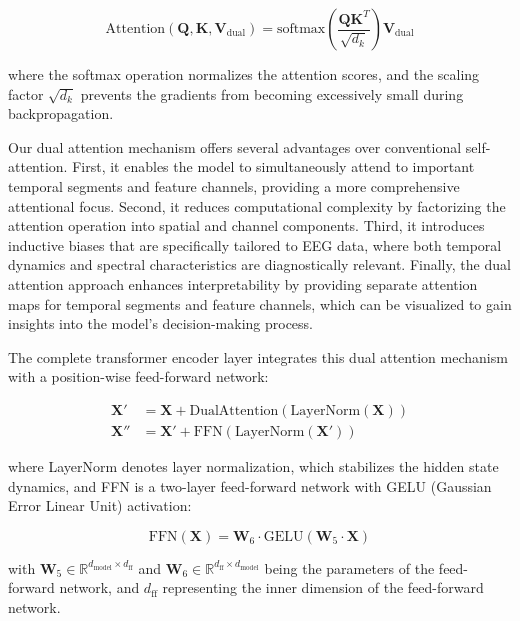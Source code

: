 \documentclass[pdflatex,sn-mathphys-num]{sn-jnl}%
\theoremstyle{thmstyleone}%
\theoremstyle{thmstyletwo}%
\theoremstyle{thmstylethree}%
\begin{document}
\begin{equation}
\text{Attention}(\mathbf{Q}, \mathbf{K}, \mathbf{V}_{\text{dual}}) = \text{softmax}\left(\frac{\mathbf{Q}\mathbf{K}^T}{\sqrt{d_k}}\right)\mathbf{V}_{\text{dual}}
\end{equation}

where the softmax operation normalizes the attention scores, and the scaling factor $\sqrt{d_k}$ prevents the gradients from becoming excessively small during backpropagation.

Our dual attention mechanism offers several advantages over conventional self-attention. First, it enables the model to simultaneously attend to important temporal segments and feature channels, providing a more comprehensive attentional focus. Second, it reduces computational complexity by factorizing the attention operation into spatial and channel components. Third, it introduces inductive biases that are specifically tailored to EEG data, where both temporal dynamics and spectral characteristics are diagnostically relevant. Finally, the dual attention approach enhances interpretability by providing separate attention maps for temporal segments and feature channels, which can be visualized to gain insights into the model's decision-making process.

The complete transformer encoder layer integrates this dual attention mechanism with a position-wise feed-forward network:

\begin{equation}
\begin{aligned}
\mathbf{X}' &= \mathbf{X} + \text{DualAttention}(\text{LayerNorm}(\mathbf{X})) \\
\mathbf{X}'' &= \mathbf{X}' + \text{FFN}(\text{LayerNorm}(\mathbf{X}'))
\end{aligned}
\end{equation}

where LayerNorm denotes layer normalization, which stabilizes the hidden state dynamics, and FFN is a two-layer feed-forward network with GELU (Gaussian Error Linear Unit) activation:

\begin{equation}
\text{FFN}(\mathbf{X}) = \mathbf{W}_6 \cdot \text{GELU}(\mathbf{W}_5 \cdot \mathbf{X})
\end{equation}

with $\mathbf{W}_5 \in \mathbb{R}^{d_{\text{model}} \times d_{\text{ff}}}$ and $\mathbf{W}_6 \in \mathbb{R}^{d_{\text{ff}} \times d_{\text{model}}}$ being the parameters of the feed-forward network, and $d_{\text{ff}}$ representing the inner dimension of the feed-forward network.
\end{document}
